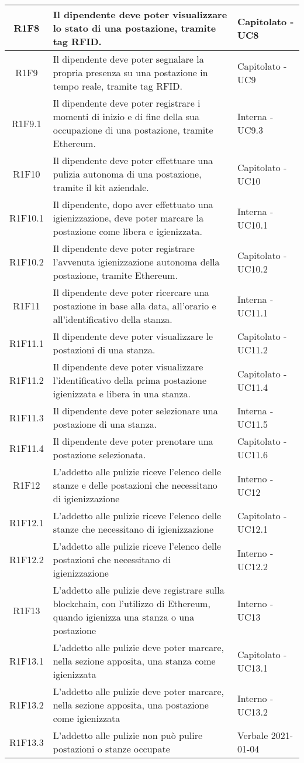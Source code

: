 \begin{center}
\begin{longtable}{|c|p{10cm}|p{4cm}|}
\hline
					R1F8&Il dipendente deve poter visualizzare lo stato di una postazione, tramite tag RFID.	&Capitolato - UC8 	\\
					\hline
			R1F9&Il dipendente deve poter segnalare la propria presenza su una postazione in tempo reale, tramite tag RFID.	&Capitolato - UC9 	\\
		\hline
		R1F9.1&Il dipendente deve poter registrare i momenti di inizio e di fine della sua occupazione di una postazione, tramite Ethereum.	&Interna - UC9.3 	\\
		\hline	
		R1F10&Il dipendente deve poter effettuare una pulizia autonoma di una postazione, tramite il kit aziendale.	&Capitolato - UC10	\\
		\hline		
		R1F10.1&Il dipendente, dopo aver effettuato una igienizzazione, deve poter marcare la postazione come libera e igienizzata.	&Interna - UC10.1	\\
		\hline	
		R1F10.2&Il dipendente deve poter registrare l'avvenuta igienizzazione autonoma della postazione, tramite Ethereum.	&Capitolato - UC10.2	\\
		\hline	
		R1F11&Il dipendente deve poter ricercare una postazione in base alla data, all'orario e all'identificativo della stanza.	&Interna - UC11.1	\\
		\hline
		R1F11.1&Il dipendente deve poter visualizzare le postazioni di una stanza.	&Capitolato - UC11.2	\\
		\hline
		R1F11.2&Il dipendente deve poter visualizzare l'identificativo della prima postazione igienizzata e libera in una stanza.	&Capitolato - UC11.4	\\
		\hline
		R1F11.3&Il dipendente deve poter selezionare una postazione di una stanza.	&Interna - UC11.5	\\
		\hline
		R1F11.4&Il dipendente deve poter prenotare una postazione selezionata.	&Capitolato - UC11.6	\\
		\hline
R1F12&L'addetto alle pulizie riceve l'elenco delle stanze e delle postazioni che necessitano di igienizzazione	& Interno - UC12	\\
						\hline
			R1F12.1&	L'addetto alle pulizie riceve l'elenco delle stanze che necessitano di igienizzazione& 	Capitolato - UC12.1\\
					\hline
			R1F12.2&L'addetto alle pulizie riceve l'elenco delle postazioni che necessitano di igienizzazione	& Interno - UC12.2	\\
					\hline
R1F13&L'addetto alle pulizie deve registrare sulla blockchain, con l'utilizzo di Ethereum, quando igienizza una stanza o una postazione	& Interno - UC13	\\
					\hline
R1F13.1&L'addetto alle pulizie deve poter marcare, nella sezione apposita, una stanza come igienizzata	& Capitolato - UC13.1	\\
						\hline
			R1F13.2&L'addetto alle pulizie deve poter marcare, nella sezione apposita, una postazione come igienizzata	&Interno - UC13.2 	\\
					\hline
			R1F13.3&L'addetto alle pulizie non può pulire postazioni o stanze occupate	& Verbale 2021-01-04	\\
					\hline
						

\end{longtable}
\end{center}
